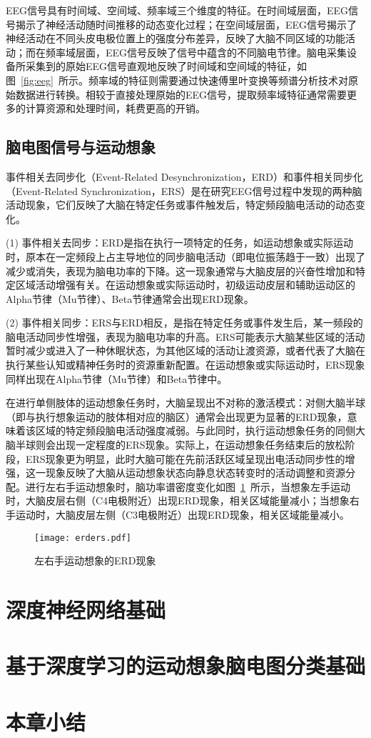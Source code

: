 EEG信号具有时间域、空间域、频率域三个维度的特征。在时间域层面，EEG信号揭示了神经活动随时间推移的动态变化过程；在空间域层面，EEG信号揭示了神经活动在不同头皮电极位置上的强度分布差异，反映了大脑不同区域的功能活动；而在频率域层面，EEG信号反映了信号中蕴含的不同脑电节律。脑电采集设备所采集到的原始EEG信号直观地反映了时间域和空间域的特征，如图~\ref{fig:eeg}~所示。频率域的特征则需要通过快速傅里叶变换等频谱分析技术对原始数据进行转换。相较于直接处理原始的EEG信号，提取频率域特征通常需要更多的计算资源和处理时间，耗费更高的开销。

\subsection{脑电图信号与运动想象}

事件相关去同步化（Event-Related Desynchronization，ERD）和事件相关同步化（Event-Related Synchronization，ERS）是在研究EEG信号过程中发现的两种脑活动现象，它们反映了大脑在特定任务或事件触发后，特定频段脑电活动的动态变化。

(1) 事件相关去同步：ERD是指在执行一项特定的任务，如运动想象或实际运动时，原本在一定频段上占主导地位的同步脑电活动（即电位振荡趋于一致）出现了减少或消失，表现为脑电功率的下降。这一现象通常与大脑皮层的兴奋性增加和特定区域活动增强有关。在运动想象或实际运动时，初级运动皮层和辅助运动区的Alpha节律（Mu节律）、Beta节律通常会出现ERD现象。

(2) 事件相关同步：ERS与ERD相反，是指在特定任务或事件发生后，某一频段的脑电活动同步性增强，表现为脑电功率的升高。ERS可能表示大脑某些区域的活动暂时减少或进入了一种休眠状态，为其他区域的活动让渡资源，或者代表了大脑在执行某些认知或精神任务时的资源重新配置。在运动想象或实际运动时，ERS现象同样出现在Alpha节律（Mu节律）和Beta节律中。

在进行单侧肢体的运动想象任务时，大脑呈现出不对称的激活模式：对侧大脑半球（即与执行想象运动的肢体相对应的脑区）通常会出现更为显著的ERD现象，意味着该区域的特定频段脑电活动强度减弱\cite{pfurtscheller1977event}。与此同时，执行运动想象任务的同侧大脑半球则会出现一定程度的ERS现象。实际上，在运动想象任务结束后的放松阶段，ERS现象更为明显，此时大脑可能在先前活跃区域呈现出电活动同步性的增强，这一现象反映了大脑从运动想象状态向静息状态转变时的活动调整和资源分配。进行左右手运动想象时，脑功率谱密度变化如图~\ref{fig:erders}~所示，当想象左手运动时，大脑皮层右侧（C4电极附近）出现ERD现象，相关区域能量减小；当想象右手运动时，大脑皮层左侧（C3电极附近）出现ERD现象，相关区域能量减小。
\begin{figure}
    \centering
    \texttt{[image: erders.pdf]}
    \caption{左右手运动想象的ERD现象}
    \label{fig:erders}
\end{figure}

\section{深度神经网络基础}



\section{基于深度学习的运动想象脑电图分类基础}

\section{本章小结}
